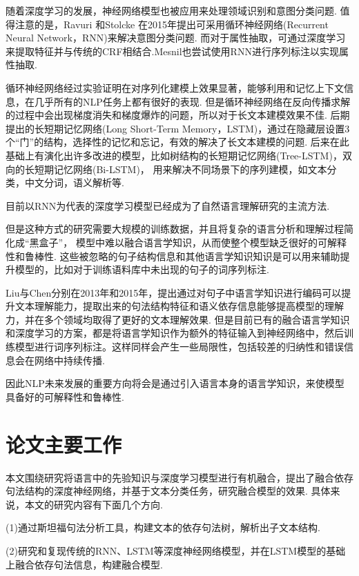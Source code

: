 \documentclass[bachelor,adobefonts]{jnuthesis}
\begin{document}
随着深度学习的发展，神经网络模型也被应用来处理领域识别和意图分类问题.
值得注意的是，Ravuri 和Stolcke 在2015年提出可采用循环神经网络(Recurrent Neural Network，RNN)来解决意图分类问题\cite{Sarikaya2011Deep,Tur2016Towards}.
而对于属性抽取，可通过深度学习来提取特征并与传统的CRF相结合\cite{Xu2014Convolutional}.Mesnil也尝试使用RNN进行序列标注以实现属性抽取\cite{Mesnil2013Investigation}.

循环神经网络经过实验证明在对序列化建模上效果显著，能够利用和记忆上下文信息，在几乎所有的NLP任务上都有很好的表现.
但是循环神经网络在反向传播求解的过程中会出现梯度消失和梯度爆炸的问题，所以对于长文本建模效果不佳.
后期提出的长短期记忆网络\cite{Graves2012Long}(Long Short-Term Memory，LSTM)，通过在隐藏层设置3个“门”的结构，选择性的记忆和忘记，有效的解决了长文本建模的问题.
后来在此基础上有演化出许多改进的模型，比如树结构的长短期记忆网络\cite{Tai2015Improved}(Tree-LSTM)，双向的长短期记忆网络\cite{Bahdanau2014Neural}(Bi-LSTM)，
用来解决不同场景下的序列建模，如文本分类，中文分词，语义解析等.

目前以RNN为代表的深度学习模型已经成为了自然语言理解研究的主流方法.

但是这种方式的研究需要大规模的训练数据，并且将复杂的语言分析和理解过程简化成“黑盒子”，
模型中难以融合语言学知识，从而使整个模型缺乏很好的可解释性和鲁棒性.
这些被忽略的句子结构信息和其他语言学知识知识是可以用来辅助提升模型的，比如对于训练语料库中未出现的句子的词序列标注\cite{Deoras2013Deep}.

Liu与Chen分别在2013年\cite{Liu2014Query}和2015年\cite{Chen2015Matrix}，提出通过对句子中语言学知识进行编码可以提升文本理解能力，提取出来的句法结构特征和语义依存信息能够提高模型的理解力，并在多个领域均取得了更好的文本理解效果.
但是目前已有的融合语言学知识和深度学习的方案，都是将语言学知识作为额外的特征输入到神经网络中，然后训练模型进行词序列标注。这样同样会产生一些局限性，包括较差的归纳性和错误信息会在网络中持续传播.

因此NLP未来发展的重要方向将会是通过引入语言本身的语言学知识，来使模型具备好的可解释性和鲁棒性.

\section{论文主要工作}
本文围绕研究将语言中的先验知识与深度学习模型进行有机融合，提出了融合依存句法结构的深度神经网络，并基于文本分类任务，研究融合模型的效果.
具体来说，本文的研究内容有下面几个方向.

(1)通过斯坦福句法分析工具，构建文本的依存句法树，解析出子文本结构.

(2)研究和复现传统的RNN、LSTM等深度神经网络模型，并在LSTM模型的基础上融合依存句法信息，构建融合模型.
\end{document}
